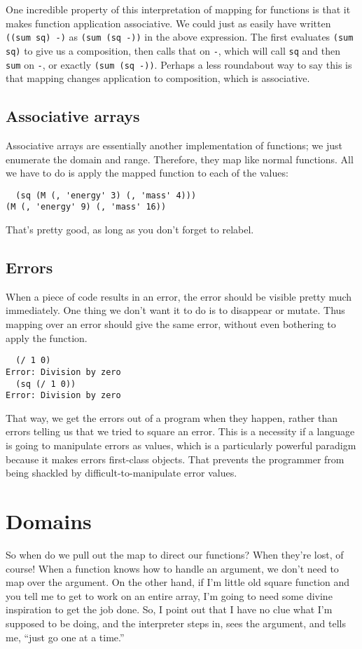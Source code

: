 \documentclass{article}
\newcommand{\code}[1]{\lstinline`#1`}
\begin{document}
One incredible property of this interpretation of mapping for functions is that it makes function application associative. We could just as easily have written \code{((sum sq) -)} as \code{(sum (sq -))} in the above expression. The first evaluates \code{(sum sq)} to give us a composition, then calls that on \code{-}, which will call \code{sq} and then \code{sum} on \code{-}, or exactly \code{(sum (sq -))}. Perhaps a less roundabout way to say this is that mapping changes application to composition, which is associative.

\subsection{Associative arrays}
Associative arrays are essentially another implementation of functions; we just enumerate the domain and range. Therefore, they map like normal functions. All we have to do is apply the mapped function to each of the values:
\begin{lstlisting}
  (sq (M (, 'energy' 3) (, 'mass' 4)))
(M (, 'energy' 9) (, 'mass' 16))
\end{lstlisting}
That's pretty good, as long as you don't forget to relabel.

\subsection{Errors}
When a piece of code results in an error, the error should be visible pretty much immediately. One thing we don't want it to do is to disappear or mutate. Thus mapping over an error should give the same error, without even bothering to apply the function.
\begin{lstlisting}
  (/ 1 0)
Error: Division by zero
  (sq (/ 1 0))
Error: Division by zero
\end{lstlisting}
That way, we get the errors out of a program when they happen, rather than errors telling us that we tried to square an error. This is a necessity if a language is going to manipulate errors as values, which is a particularly powerful paradigm because it makes errors first-class objects. That prevents the programmer from being shackled by difficult-to-manipulate error values.

\section{Domains}
So when do we pull out the map to direct our functions? When they're lost, of course! When a function knows how to handle an argument, we don't need to map over the argument. On the other hand, if I'm little old square function and you tell me to get to work on an entire array, I'm going to need some divine inspiration to get the job done. So, I point out that I have no clue what I'm supposed to be doing, and the interpreter steps in, sees the argument, and tells me, ``just go one at a time.''
\end{document}
